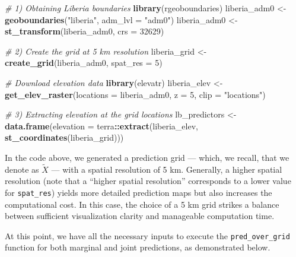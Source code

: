 \documentclass[
  letterpaper,
]{krantz}
\newenvironment{Shaded}{\begin{snugshade}}{\end{snugshade}}
\newcommand{\AttributeTok}[1]{\textcolor[rgb]{0.13,0.29,0.53}{#1}}
\newcommand{\CommentTok}[1]{\textcolor[rgb]{0.56,0.35,0.01}{\textit{#1}}}
\newcommand{\DecValTok}[1]{\textcolor[rgb]{0.00,0.00,0.81}{#1}}
\newcommand{\FunctionTok}[1]{\textcolor[rgb]{0.13,0.29,0.53}{\textbf{#1}}}
\newcommand{\NormalTok}[1]{#1}
\newcommand{\OtherTok}[1]{\textcolor[rgb]{0.56,0.35,0.01}{#1}}
\newcommand{\SpecialCharTok}[1]{\textcolor[rgb]{0.81,0.36,0.00}{\textbf{#1}}}
\newcommand{\StringTok}[1]{\textcolor[rgb]{0.31,0.60,0.02}{#1}}
\begin{document}
\begin{Shaded}
\begin{Highlighting}[]
\CommentTok{\# 1) Obtaining Liberia boundaries }
\FunctionTok{library}\NormalTok{(rgeoboundaries)}
\NormalTok{liberia\_adm0 }\OtherTok{\textless{}{-}} \FunctionTok{geoboundaries}\NormalTok{(}\StringTok{"liberia"}\NormalTok{, }\AttributeTok{adm\_lvl =} \StringTok{"adm0"}\NormalTok{)}
\NormalTok{liberia\_adm0 }\OtherTok{\textless{}{-}} \FunctionTok{st\_transform}\NormalTok{(liberia\_adm0, }\AttributeTok{crs =} \DecValTok{32629}\NormalTok{)}

\CommentTok{\# 2) Create the grid at 5 km resolution}
\NormalTok{liberia\_grid }\OtherTok{\textless{}{-}} \FunctionTok{create\_grid}\NormalTok{(liberia\_adm0, }\AttributeTok{spat\_res =} \DecValTok{5}\NormalTok{)}

\CommentTok{\# Download elevation data}
\FunctionTok{library}\NormalTok{(elevatr)}
\NormalTok{liberia\_elev }\OtherTok{\textless{}{-}} \FunctionTok{get\_elev\_raster}\NormalTok{(}\AttributeTok{locations =}\NormalTok{ liberia\_adm0, }
                                \AttributeTok{z =} \DecValTok{5}\NormalTok{, }\AttributeTok{clip =} \StringTok{"locations"}\NormalTok{)}

\CommentTok{\# 3) Extracting elevation at the grid locations}
\NormalTok{lb\_predictors }\OtherTok{\textless{}{-}} \FunctionTok{data.frame}\NormalTok{(}\AttributeTok{elevation =} 
\NormalTok{                         terra}\SpecialCharTok{::}\FunctionTok{extract}\NormalTok{(liberia\_elev,}
                                \FunctionTok{st\_coordinates}\NormalTok{(liberia\_grid)))}
\end{Highlighting}
\end{Shaded}

In the code above, we generated a prediction grid --- which, we recall,
that we denote as \(\tilde{X}\) --- with a spatial resolution of 5 km.
Generally, a higher spatial resolution (note that a ``higher spatial
resolution'' corresponds to a lower value for \texttt{spat\_res}) yields
more detailed prediction maps but also increases the computational cost.
In this case, the choice of a 5 km grid strikes a balance between
sufficient visualization clarity and manageable computation time.

At this point, we have all the necessary inputs to execute the
\texttt{pred\_over\_grid} function for both marginal and joint
predictions, as demonstrated below.
\end{document}
